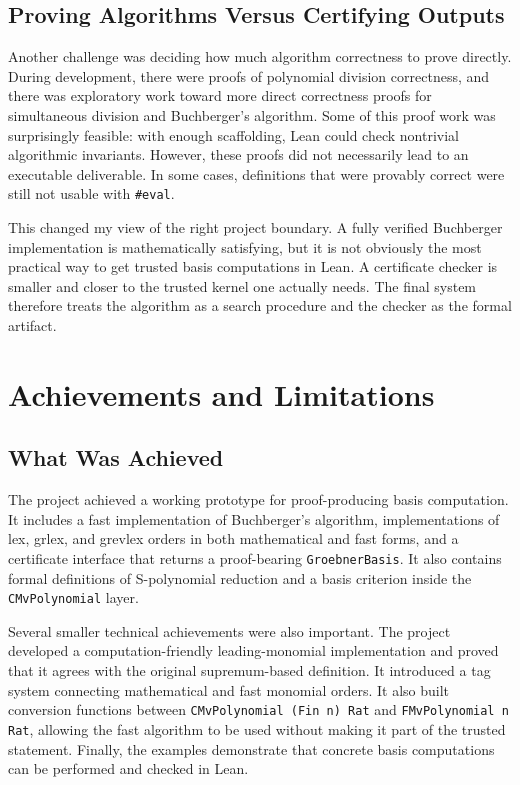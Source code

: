 \documentclass[acmsmall,nonacm,screen]{acmart}
\begin{document}
\subsection{Proving Algorithms Versus Certifying Outputs}

Another challenge was deciding how much algorithm correctness to prove directly.
During development, there were proofs of polynomial division correctness, and there was exploratory
work toward more direct correctness proofs for simultaneous division and Buchberger's algorithm.
Some of this proof work was surprisingly feasible: with enough scaffolding, Lean could check
nontrivial algorithmic invariants.
However, these proofs did not necessarily lead to an executable deliverable.
In some cases, definitions that were provably correct were still not usable with \texttt{\#eval}.

This changed my view of the right project boundary.
A fully verified Buchberger implementation is mathematically satisfying, but it is not obviously
the most practical way to get trusted \Groebner{} basis computations in Lean.
A certificate checker is smaller and closer to the trusted kernel one actually needs.
The final system therefore treats the algorithm as a search procedure and the checker as the
formal artifact.

\section{Achievements and Limitations}

\subsection{What Was Achieved}

The project achieved a working prototype for proof-producing \Groebner{} basis computation.
It includes a fast implementation of Buchberger's algorithm, implementations of lex, grlex, and
grevlex orders in both mathematical and fast forms, and a certificate interface that returns a
proof-bearing \texttt{GroebnerBasis}.
It also contains formal definitions of S-polynomial reduction and a \Groebner{} basis criterion
inside the \texttt{CMvPolynomial} layer.

Several smaller technical achievements were also important.
The project developed a computation-friendly leading-monomial implementation and proved that it
agrees with the original supremum-based definition.
It introduced a tag system connecting mathematical and fast monomial orders.
It also built conversion functions between \texttt{CMvPolynomial (Fin n) Rat} and
\texttt{FMvPolynomial n Rat}, allowing the fast algorithm to be used without making it part of the
trusted statement.
Finally, the examples demonstrate that concrete \Groebner{} basis computations can be performed and
checked in Lean.
\end{document}
